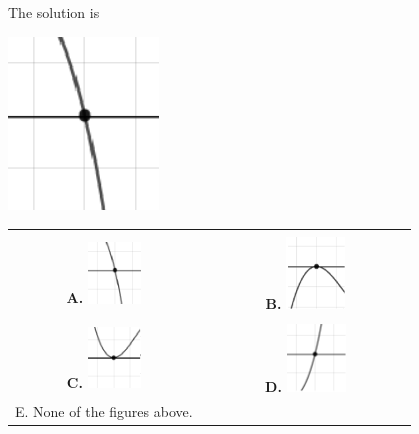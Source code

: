 \documentclass{extbook}[14pt]
\begin{document}
 
 The solution is  
 \begin{center} \includegraphics[width=0.3\textwidth]{../Figures/polyZeroBehaviorAB.png} \end{center}\begin{tabular}{|c|c|} 
\hline 
 & \tabularnewline 
 \textbf{A.} \includegraphics[width=0.3\textwidth]{../Figures/polyZeroBehaviorAB.png} & \textbf{B.} \includegraphics[width=0.3\textwidth]{../Figures/polyZeroBehaviorBB.png} \tabularnewline 
\hline 
 & \tabularnewline 
 \textbf{C.} \includegraphics[width=0.3\textwidth]{../Figures/polyZeroBehaviorCB.png} & \textbf{D.} \includegraphics[width=0.3\textwidth]{../Figures/polyZeroBehaviorDB.png} \tabularnewline 
\hline 
 E. None of the figures above. & \tabularnewline 
\hline 
 \end{tabular} 
 
\end{document}
